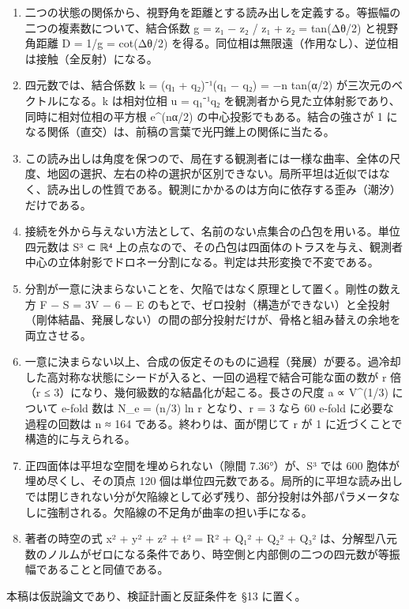 \documentclass[
  a4paper,
]{ltjsarticle}
\providecommand{\tightlist}{%
  \setlength{\itemsep}{0pt}\setlength{\parskip}{0pt}}
\begin{document}
\begin{enumerate}
\def\labelenumi{\arabic{enumi}.}
\tightlist
\item
  二つの状態の関係から、視野角を距離とする読み出しを定義する。等振幅の二つの複素数について、結合係数
  g = \textbar z₁ − z₂\textbar{} / \textbar z₁ + z₂\textbar{} =
  tan(Δθ/2) と視野角距離 D = 1/g = cot(Δθ/2)
  を得る。同位相は無限遠（作用なし）、逆位相は接触（全反射）になる。
\item
  四元数では、結合係数 k = (q₁ + q₂)⁻¹(q₁ − q₂) = −n tan(α/2)
  が三次元のベクトルになる。k は相対位相 u = q₁⁻¹q₂
  を観測者から見た立体射影であり、同時に相対位相の平方根 e\^{}(nα/2)
  の中心投影でもある。結合の強さが 1
  になる関係（直交）は、前稿の言葉で光円錐上の関係に当たる。
\item
  この読み出しは角度を保つので、局在する観測者には一様な曲率、全体の尺度、地図の選択、左右の枠の選択が区別できない。局所平坦は近似ではなく、読み出しの性質である。観測にかかるのは方向に依存する歪み（潮汐）だけである。
\item
  接続を外から与えない方法として、名前のない点集合の凸包を用いる。単位四元数は
  S³ ⊂ ℝ⁴
  上の点なので、その凸包は四面体のトラスを与え、観測者中心の立体射影でドロネー分割になる。判定は共形変換で不変である。
\item
  分割が一意に決まらないことを、欠陥ではなく原理として置く。剛性の数え方
  F − S = 3V − 6 − E
  のもとで、ゼロ投射（構造ができない）と全投射（剛体結晶、発展しない）の間の部分投射だけが、骨格と組み替えの余地を両立させる。
\item
  一意に決まらない以上、合成の仮定そのものに過程（発展）が要る。過冷却した高対称な状態にシードが入ると、一回の過程で結合可能な面の数が
  r 倍（r ≤ 3）になり、幾何級数的な結晶化が起こる。長さの尺度 a ∝
  V\^{}(1/3) について e-fold 数は N\_e = (n/3) ln r となり、r = 3 なら
  60 e-fold に必要な過程の回数は n ≈ 164 である。終わりは、面が閉じて r
  が 1 に近づくことで構造的に与えられる。
\item
  正四面体は平坦な空間を埋められない（隙間 7.36°）が、S³ では 600
  胞体が埋め尽くし、その頂点 120
  個は単位四元数である。局所的に平坦な読み出しでは閉じきれない分が欠陥線として必ず残り、部分投射は外部パラメータなしに強制される。欠陥線の不足角が曲率の担い手になる。
\item
  著者の時空の式 x² + y² + z² + t² = R² + Q₁² + Q₂² + Q₃²
  は、分解型八元数のノルムがゼロになる条件であり、時空側と内部側の二つの四元数が等振幅であることと同値である。
\end{enumerate}

本稿は仮説論文であり、検証計画と反証条件を §13 に置く。
\end{document}
